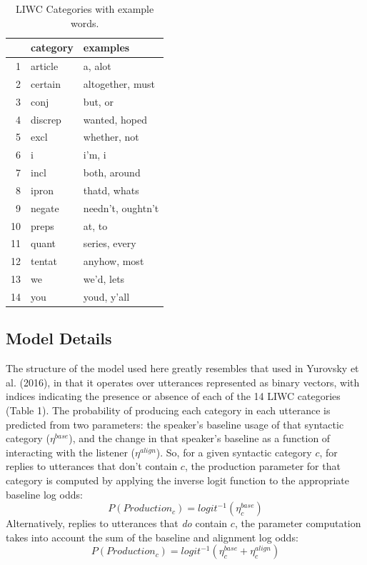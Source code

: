 \documentclass[10pt, letterpaper]{article}
\begin{document}
\begin{table}[H]
\centering
\begin{tabular}{rll}
  \hline
 & category & examples \\ 
  \hline
1 & article & a, alot \\ 
  2 & certain & altogether, must \\ 
  3 & conj & but, or \\ 
  4 & discrep & wanted, hoped \\ 
  5 & excl & whether, not \\ 
  6 & i & i'm, i \\ 
  7 & incl & both, around \\ 
  8 & ipron & thatd, whats \\ 
  9 & negate & needn't, oughtn't \\ 
  10 & preps & at, to \\ 
  11 & quant & series, every \\ 
  12 & tentat & anyhow, most \\ 
  13 & we & we'd, lets \\ 
  14 & you & youd, y'all \\ 
   \hline
\end{tabular}
\caption{LIWC Categories with example words.} 
\end{table}

\hypertarget{model-details}{%
\subsection{Model Details}\label{model-details}}

The structure of the model used here greatly resembles that used in
Yurovsky et al. (2016), in that it operates over utterances represented
as binary vectors, with indices indicating the presence or absence of
each of the 14 LIWC categories (Table 1). The probability of producing
each category in each utterance is predicted from two parameters: the
speaker's baseline usage of that syntactic category (\(\eta^{base}\)),
and the change in that speaker's baseline as a function of interacting
with the listener (\(\eta^{align}\)). So, for a given syntactic category
\(c\), for replies to utterances that don't contain \(c\), the
production parameter for that category is computed by applying the
inverse logit function to the appropriate baseline log odds: \[
P(Production_c) = logit^{-1}(\eta^{base}_c)
\] Alternatively, replies to utterances that \emph{do} contain \(c\),
the parameter computation takes into account the sum of the baseline and
alignment log odds: \[
P(Production_c) = logit^{-1}(\eta^{base}_c+\eta^{align}_c)
\]
\end{document}
